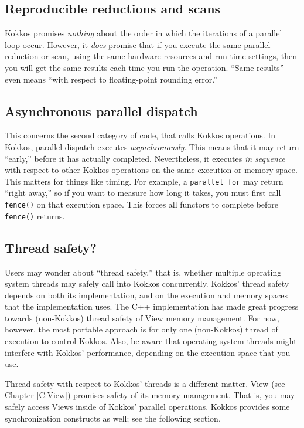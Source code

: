 \subsection{Reproducible reductions and scans}\label{SS:Model:Exec:Repro}

Kokkos promises \emph{nothing} about the order in which the iterations of a parallel loop occur.
However, it \emph{does} promise that if you execute the same parallel reduction or scan,
using the same hardware resources and run-time settings,
then you will get the same results each time you run the operation.
``Same results'' even means ``with respect to floating-point rounding error.''

\subsection{Asynchronous parallel dispatch}\label{SS:Model:Exec:Async}

This concerns the second category of code, that calls Kokkos operations.
In Kokkos, parallel dispatch executes \emph{asynchronously}.  
This means that it may return ``early,'' before it has actually completed.
Nevertheless, it executes \emph{in sequence} with respect to other Kokkos operations on the same execution or memory space.
This matters for things like timing.
For example, a \lstinline!parallel_for! may return ``right away,''
so if you want to measure how long it takes,
you must first call \lstinline!fence()! on that execution space.
This forces all functors to complete before \lstinline!fence()! returns.

\subsection{Thread safety?}\label{SS:Model:Exec:ThreadSafety}

Users may wonder about ``thread safety,'' that is,
whether multiple operating system threads may safely call into Kokkos concurrently.
Kokkos' thread safety depends on both its implementation, 
and on the execution and memory spaces that the implementation uses.
The C++ implementation has made great progress towards (non-Kokkos) thread safety of View memory management.
For now, however, the most portable approach is for only one (non-Kokkos) thread of execution to control Kokkos.
Also, be aware that operating system threads might interfere with Kokkos' performance,
depending on the execution space that you use.

Thread safety with respect to Kokkos' threads is a different matter.
View (see Chapter \ref{C:View}) promises safety of its memory management.
That is, you may safely access Views inside of Kokkos' parallel operations.
Kokkos provides some synchronization constructs as well; see the following section.
